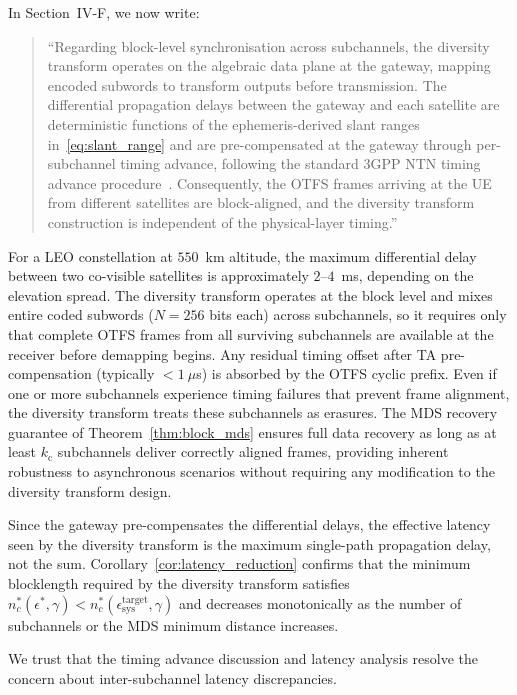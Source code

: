 In Section~IV-F, we now write:

\begin{quote}
``{\color{blue}Regarding block-level synchronisation across subchannels, the diversity transform operates on the algebraic data plane at the gateway, mapping encoded subwords to transform outputs before transmission. The differential propagation delays between the gateway and each satellite are deterministic functions of the ephemeris-derived slant ranges in~\eqref{eq:slant_range} and are pre-compensated at the gateway through per-subchannel timing advance, following the standard 3GPP NTN timing advance procedure~\cite{3GPP38821}. Consequently, the OTFS frames arriving at the UE from different satellites are block-aligned, and the diversity transform construction is independent of the physical-layer timing.}''
\end{quote}

For a LEO constellation at $550$~km altitude, the maximum differential delay between two co-visible satellites is approximately $2$--$4$~ms, depending on the elevation spread. The diversity transform operates at the block level and mixes entire coded subwords ($N = 256$ bits each) across subchannels, so it requires only that complete OTFS frames from all surviving subchannels are available at the receiver before demapping begins. Any residual timing offset after TA pre-compensation (typically $< 1~\mu$s) is absorbed by the OTFS cyclic prefix. Even if one or more subchannels experience timing failures that prevent frame alignment, the diversity transform treats these subchannels as erasures. The MDS recovery guarantee of Theorem~\ref{thm:block_mds} ensures full data recovery as long as at least $k_{\mathrm{c}}$ subchannels deliver correctly aligned frames, providing inherent robustness to asynchronous scenarios without requiring any modification to the diversity transform design.

Since the gateway pre-compensates the differential delays, the effective latency seen by the diversity transform is the maximum single-path propagation delay, not the sum. Corollary~\ref{cor:latency_reduction} confirms that the minimum blocklength required by the diversity transform satisfies $n_c^{*}(\epsilon^*, \gamma) < n_c^{*}(\epsilon_{\mathrm{sys}}^{\mathrm{target}}, \gamma)$ and decreases monotonically as the number of subchannels or the MDS minimum distance increases.

We trust that the timing advance discussion and latency analysis resolve the concern about inter-subchannel latency discrepancies.


